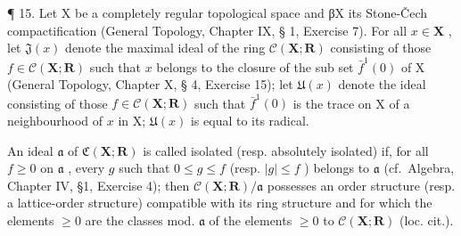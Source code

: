 ¶ 15. Let X be a completely regular topological space and βX its Stone-Čech compactification (General Topology, Chapter IX, § 1, Exercise 7). For all \(x \in \mathbf{X}\) , let \(\mathfrak{J}(x)\) denote the maximal ideal of the ring \(\mathcal{C}(\mathbf{X}; \mathbf{R})\) consisting of those \(f \in \mathcal{C}(\mathbf{X}; \mathbf{R})\) such that \(x\) belongs to the closure of the sub set \(\bar{f}^1(0)\) of X (General Topology, Chapter X, § 4, Exercise 15); let \(\mathfrak{U}(x)\) denote the ideal consisting of those \(f \in \mathcal{C}(\mathbf{X}; \mathbf{R})\) such that \(\bar{f}^1(0)\) is the trace on X of a neighbourhood of \(x\) in X; \(\mathfrak{U}(x)\) is equal to its radical.

An ideal \(\mathfrak{a}\) of \(\mathfrak{C}(\mathbf{X};\mathbf{R})\) is called isolated (resp. absolutely isolated) if, for all \(f\geqslant 0\) on \(\mathfrak{a}\) , every \(g\) such that \(0\leqslant g\leqslant f\) (resp. \(|g|\leqslant f\) ) belongs to \(\mathfrak{a}\) (cf.~Algebra, Chapter IV, §1, Exercise 4); then \(\mathcal{C}(\mathbf{X};\mathbf{R}) / \mathfrak{a}\) possesses an order structure (resp. a lattice-order structure) compatible with its ring structure and for which the elements \(\geqslant 0\) are the classes mod. \(\mathfrak{a}\) of the elements \(\geqslant 0\) to \(\mathcal{C}(\mathbf{X};\mathbf{R})\) (loc. cit.).


